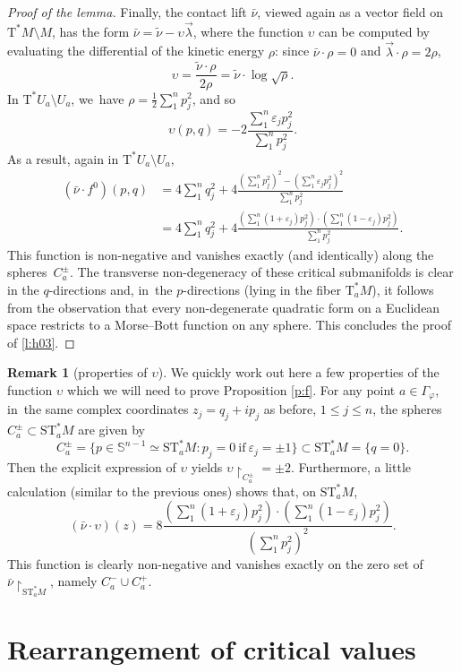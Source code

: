 \documentclass[JEP,XML,SOM,Unicode]{cedram}
\let\epsilon\varepsilon
\newcommand{\bS}{{\mathbb S}}
\newcommand{\Crit}{\Gamma_{\!\varphi}}
\newcommand{\sT}{\mathrm{T}^\ast}
\newcommand{\sST}{\mathrm{ST}^\ast}
\newcommand{\hnu}{\tilde\nu}
\newcommand{\cnu}{\bar\nu}
\newcommand{\rst}[1]{{\upharpoonright}_{\!#1}}
\newcommand{\lrp}[1]{\left(#1\right)}
\newcommand{\with}{\mathrel{:}}
\let\ups\upsilon
\let\sgn\epsilon
\theoremstyle{plain}
\theoremstyle{definition}
\newtheorem{remark}[theorem]{Remark}
\begin{document}
\begin{proof}[Proof of the lemma]
Finally, the contact lift $\cnu$, viewed again as a vector field on $\sT M \setminus M$,
has the form $\cnu = \hnu - \ups \vec\lambda$, where the function $\ups$ can be
computed by evaluating the differential of the kinetic energy $\rho$: since
$\cnu \cdot \rho = 0$ and $\vec\lambda \cdot \rho = 2\rho$,
\[
\ups = \frac{ \hnu \cdot \rho }{ 2\rho } = \hnu \cdot \log \sqrt\rho.
\]
In $\sT U_a\setminus U_a$, we~have $\rho = \frac12 \sum_1^n p_j^2$, and so
\[
\ups(p,q) = -2 \frac{ \sum_1^n \sgn_j p_j^2 }{ \sum_1^n p_j^2 }.
\]
As a result, again in $\sT U_a\setminus U_a$,
\begin{align*}
	(\cnu \cdot f^0) (p,q) &= 4 \sum_1^n q_j^2 + 4 \frac
	{ \lrp{ \sum_1^n p_j^2 }^2 - \lrp{ \sum_1^n \sgn_j p_j^2 }^2 }
 { \sum_1^n p_j^2 } \\
	&= 4 \sum_1^n q_j^2 + 4 \frac
 { \lrp{\sum_1^n (1+\sgn_j) p_j^2} \cdot \lrp{\sum_1^n (1-\sgn_j) p_j^2} }
 { \sum_1^n p_j^2 }.
\end{align*}
This function is non-negative and vanishes exactly (and identically) along the
spheres~$C_a^\pm$. The transverse non-degeneracy of these critical submanifolds
is clear in the $q$-directions and, in~the $p$-directions (lying in the fiber
$\sT_aM$), it follows from the observation that every non-degenerate quadratic
form on a Euclidean space restricts to a Morse--Bott function on any sphere.
This concludes the proof of \eqref{l:h03}.
\end{proof}

\begin{remark}[properties of $\ups$] \label{r:upsilon}
We quickly work out here a few properties of the function $\ups$ which we will
need to prove Proposition \ref{p:f}. For any point $a \in \Crit$, in~the same
complex coordinates $z_j = q_j+ip_j$ as before, $1 \le j \le n$, the spheres
$C_a^\pm \subset \sST_aM$ are given by
\[
C_a^\pm = \{p \in \bS^{n-1} \simeq \sST_aM \with
	p_j=0\ \text{if}\ \sgn_j = \pm1\} \subset \sST_aM = \{q=0\}.
\]
Then the explicit expression of $\ups$ yields $\ups \rst{ C_a^\pm } = \pm2$.
Furthermore, a little calculation (similar to the previous ones) shows that, on
$\sST_aM$,
\[
(\cnu \cdot \ups) (z) = 8 \frac
 { \lrp{\sum_1^n (1+\sgn_j) p_j^2} \cdot \lrp{\sum_1^n (1-\sgn_j) p_j^2} }
	{ \lrp{ \sum_1^n p_j^2 }^2 }.
\]
This function is clearly non-negative and vanishes exactly on the zero set of
$\cnu \rst{ \sST_aM }$, namely $C_a^- \cup C_a^+$.
\end{remark}

\section{Rearrangement of critical values}
\end{document}
